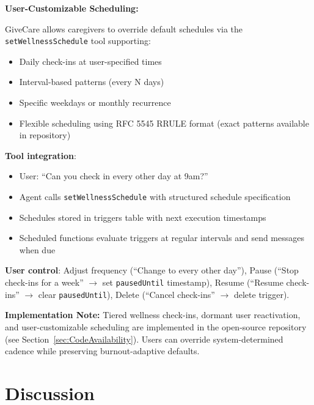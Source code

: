 \documentclass{article}
\begin{document}
\textbf{User-Customizable Scheduling:}

GiveCare allows caregivers to override default schedules via the \texttt{setWellnessSchedule} tool supporting:
\begin{itemize}
    \item Daily check-ins at user-specified times
    \item Interval-based patterns (every N days)
    \item Specific weekdays or monthly recurrence
    \item Flexible scheduling using RFC 5545 RRULE format (exact patterns available in repository)
\end{itemize}

\textbf{Tool integration}:
\begin{itemize}
    \item User: ``Can you check in every other day at 9am?''
    \item Agent calls \texttt{setWellnessSchedule} with structured schedule specification
    \item Schedules stored in triggers table with next execution timestamps
    \item Scheduled functions evaluate triggers at regular intervals and send messages when due
\end{itemize}

\textbf{User control}: Adjust frequency (``Change to every other day''), Pause (``Stop check-ins for a week'' $\rightarrow$ set \texttt{pausedUntil} timestamp), Resume (``Resume check-ins'' $\rightarrow$ clear \texttt{pausedUntil}), Delete (``Cancel check-ins'' $\rightarrow$ delete trigger).

\textbf{Implementation Note:} Tiered wellness check-ins, dormant user reactivation, and user-customizable scheduling are implemented in the open-source repository (see Section~\ref{sec:CodeAvailability}). Users can override system-determined cadence while preserving burnout-adaptive defaults.


%
\section{Discussion}%
\label{sec:Discussion}%
%
\end{document}

